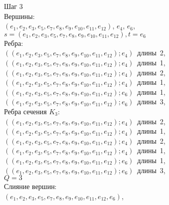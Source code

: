 \begin{minipage}{\textwidth}
Шаг 3\\
Вершины:\\
\mbox{$(e_{1},e_{2},e_{3},e_{5},e_{7},e_{8},e_{9},e_{10},e_{11},e_{12})$},
\mbox{$e_{4}$},
\mbox{$e_{6}$},
\\
\mbox{$s=(e_{1},e_{2},e_{3},e_{5},e_{7},e_{8},e_{9},e_{10},e_{11},e_{12}),t=e_{6}$}\\
Ребра:\\
\mbox{$((e_{1},e_{2},e_{3},e_{5},e_{7},e_{8},e_{9},e_{10},e_{11},e_{12});e_{4})$ длины 2},
\mbox{$((e_{1},e_{2},e_{3},e_{5},e_{7},e_{8},e_{9},e_{10},e_{11},e_{12});e_{4})$ длины 1},
\mbox{$((e_{1},e_{2},e_{3},e_{5},e_{7},e_{8},e_{9},e_{10},e_{11},e_{12});e_{4})$ длины 2},
\mbox{$((e_{1},e_{2},e_{3},e_{5},e_{7},e_{8},e_{9},e_{10},e_{11},e_{12});e_{4})$ длины 1},
\mbox{$((e_{1},e_{2},e_{3},e_{5},e_{7},e_{8},e_{9},e_{10},e_{11},e_{12});e_{6})$ длины 1},
\mbox{$((e_{1},e_{2},e_{3},e_{5},e_{7},e_{8},e_{9},e_{10},e_{11},e_{12});e_{6})$ длины 3},
\\
Ребра сечения $K_{3}$:\\
\mbox{$((e_{1},e_{2},e_{3},e_{5},e_{7},e_{8},e_{9},e_{10},e_{11},e_{12});e_{4})$ длины 2},
\mbox{$((e_{1},e_{2},e_{3},e_{5},e_{7},e_{8},e_{9},e_{10},e_{11},e_{12});e_{4})$ длины 1},
\mbox{$((e_{1},e_{2},e_{3},e_{5},e_{7},e_{8},e_{9},e_{10},e_{11},e_{12});e_{4})$ длины 2},
\mbox{$((e_{1},e_{2},e_{3},e_{5},e_{7},e_{8},e_{9},e_{10},e_{11},e_{12});e_{4})$ длины 1},
\mbox{$((e_{1},e_{2},e_{3},e_{5},e_{7},e_{8},e_{9},e_{10},e_{11},e_{12});e_{6})$ длины 1},
\mbox{$((e_{1},e_{2},e_{3},e_{5},e_{7},e_{8},e_{9},e_{10},e_{11},e_{12});e_{6})$ длины 3},
\\
$Q=3$\\
Слияние вершин:\\
\mbox{$(e_{1},e_{2},e_{3},e_{5},e_{7},e_{8},e_{9},e_{10},e_{11},e_{12},e_{6})$},
\end{minipage}
